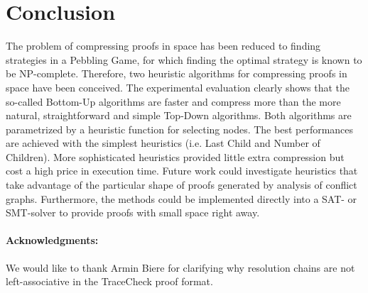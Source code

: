 \section{Conclusion}
\label{sec:conclusion}

The problem of compressing proofs in space has been reduced to finding strategies in a Pebbling Game, 
for which finding the optimal strategy is known to be NP-complete.
Therefore, two heuristic algorithms for compressing proofs in space have been conceived. 
The experimental evaluation clearly shows that the so-called Bottom-Up algorithms are faster and compress more than the more natural, 
straightforward and simple Top-Down algorithms. 
Both algorithms are parametrized by a heuristic function for selecting nodes. 
The best performances are achieved with the simplest heuristics (i.e. Last Child and Number of Children). 
More sophisticated heuristics provided little extra compression but cost a high price in execution time. 
Future work could investigate heuristics that take advantage of the particular shape of proofs generated by analysis of conflict graphs.
Furthermore, the methods could be implemented directly into a SAT- or SMT-solver to provide proofs with small space right away.

\vspace{-5pt}
\paragraph{Acknowledgments:} We would like to thank Armin Biere for clarifying why resolution chains are not left-associative in the TraceCheck proof format.

\vspace{-5pt}

